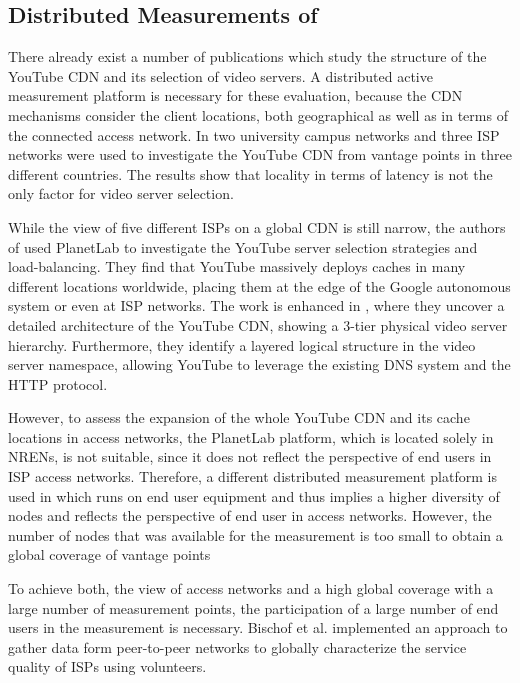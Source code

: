 \subsection{Distributed Measurements of }
There already exist a number of publications which study the structure of the YouTube CDN and its selection of video servers.
A distributed active measurement platform is necessary for these evaluation, because the CDN mechanisms consider the client locations, both geographical as well as in terms of the connected access network.
In \cite{torres2011dissecting} two university campus networks and three ISP networks were used to investigate the YouTube CDN from vantage points in three different countries.
The results show that locality in terms of latency is not the only factor for video server selection.

While the view of five different ISPs on a global CDN is still narrow, the authors of \cite{adhikari2011you} used PlanetLab  to investigate the YouTube server selection strategies and load-balancing.
They find that YouTube massively deploys caches in many different locations worldwide, placing them at the edge of the Google autonomous system or even at ISP networks.
The work is enhanced in \cite{adhikari2012vivisecting}, where they uncover a detailed architecture of the YouTube CDN, showing a 3-tier physical video server hierarchy.
Furthermore, they identify a layered logical structure in the video server namespace, allowing YouTube to leverage the existing DNS system and the HTTP protocol.

However, to assess the expansion of the whole YouTube CDN and its cache locations in access networks, the PlanetLab platform, which is located solely in NRENs, is not suitable, since it does not reflect the perspective of end users in ISP access networks.
Therefore, a different distributed measurement platform is used in \cite{rafetseder2011exploring} which runs on end user equipment and thus implies a higher diversity of nodes and reflects the perspective of end user in access networks.
However, the number of nodes that was available for the measurement is too small to obtain a global coverage of vantage points

To achieve both, the view of access networks and a high global coverage with a large number of measurement points, the participation of a large number of end users in the measurement is necessary.
Bischof et al. \cite{bischof2011crowdsourcing} implemented an approach to gather data form peer-to-peer networks to globally characterize the service quality of ISPs using volunteers.

